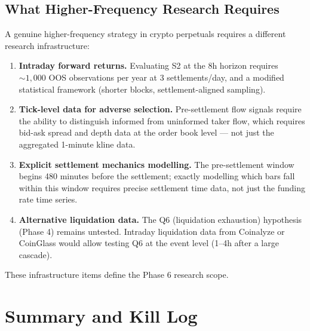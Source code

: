 \documentclass[12pt, a4paper]{article}
\theoremstyle{plain}
\theoremstyle{definition}
\begin{document}
\subsection{What Higher-Frequency Research Requires}

A genuine higher-frequency strategy in crypto perpetuals requires
a different research infrastructure:

\begin{enumerate}
  \item \textbf{Intraday forward returns.}  Evaluating S2 at the 8h
        horizon requires $\sim 1{,}000$ OOS observations per year at
        3 settlements/day, and a modified statistical framework
        (shorter blocks, settlement-aligned sampling).

  \item \textbf{Tick-level data for adverse selection.}  Pre-settlement
        flow signals require the ability to distinguish informed from
        uninformed taker flow, which requires bid-ask spread and depth
        data at the order book level --- not just the aggregated 1-minute
        kline data.

  \item \textbf{Explicit settlement mechanics modelling.}  The pre-settlement
        window begins 480 minutes before the settlement; exactly modelling
        which bars fall within this window requires precise settlement time
        data, not just the funding rate time series.

  \item \textbf{Alternative liquidation data.}  The Q6 (liquidation
        exhaustion) hypothesis (Phase 4) remains untested.  Intraday
        liquidation data from Coinalyze or CoinGlass would allow testing
        Q6 at the event level (1--4h after a large cascade).
\end{enumerate}

These infrastructure items define the Phase 6 research scope.

\section{Summary and Kill Log}
\label{sec:summary}
\end{document}
